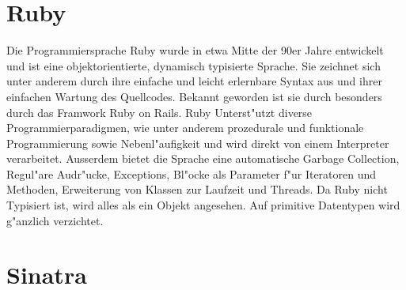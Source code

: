 \section{Ruby}
Die Programmiersprache Ruby wurde in etwa Mitte der 90er Jahre entwickelt und ist eine objektorientierte, dynamisch typisierte Sprache.
Sie zeichnet sich unter anderem durch ihre einfache und leicht erlernbare Syntax aus und ihrer einfachen Wartung des Quellcodes.
Bekannt geworden ist sie durch besonders durch das Framwork Ruby on Rails.\newline
Ruby Unterst"utzt diverse Programmierparadigmen, wie unter anderem prozedurale und funktionale Programmierung sowie Nebenl"aufigkeit und wird direkt von einem Interpreter verarbeitet. Ausserdem bietet die Sprache eine automatische Garbage Collection, Regul"are Audr"ucke, Exceptions, Bl"ocke als Parameter f"ur Iteratoren und Methoden, Erweiterung von Klassen zur Laufzeit und Threads.\newline 
Da Ruby nicht Typisiert ist, wird alles als ein Objekt angesehen. Auf primitive Datentypen wird g"anzlich verzichtet.

\section{Sinatra}